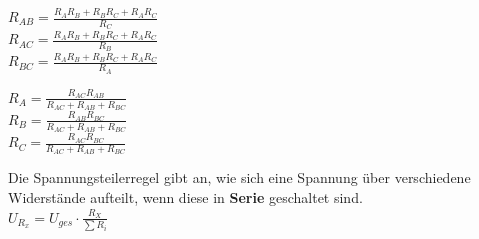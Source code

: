 \begin{minipage}{0.5\textwidth}
	\begin{center}

	${R}_{AB}=\frac{{R}_{A}{R}_{B}+{R}_{B}{R}_{C}+{R}_{A}{R}_{C}}{{R}_{C}}$\\
	${R}_{AC}=\frac{{R}_{A}{R}_{B}+{R}_{B}{R}_{C}+{R}_{A}{R}_{C}}{{R}_{B}}$\\
	${R}_{BC}=\frac{{R}_{A}{R}_{B}+{R}_{B}{R}_{C}+{R}_{A}{R}_{C}}{{R}_{A}}$\\

	\end{center}
\end{minipage}
\begin{minipage}{0.5\textwidth}
\begin{center}

		${R}_A=\frac{{R}_{AC}{R}_{AB}}{{R}_{AC}+{R}_{AB}+{R}_{BC}}$\\
		${R}_B=\frac{{R}_{AB}{R}_{BC}}{{R}_{AC}+{R}_{AB}+{R}_{BC}}$\\
		${R}_C=\frac{{R}_{AC}{R}_{BC}}{{R}_{AC}+{R}_{AB}+{R}_{BC}}$

	\end{center}
\end{minipage}

\newpage



										\begingl
										Die Spannungsteilerregel gibt an, wie sich eine Spannung über verschiedene Widerstände aufteilt, wenn diese in \textbf{Serie} geschaltet sind. \\
											\formulaBegin
											$\displaystyle U_{R_x} = U_{ges} \cdot \frac{R_X}{\sum R_i} $
											\formulaEnd

											\begin{center}
											\end{center}
										\iend


